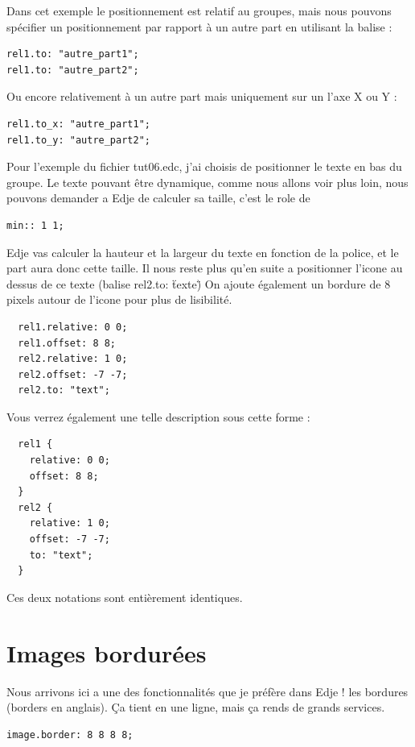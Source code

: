 \documentclass[a4paper]{efr}
\begin{document}
Dans cet exemple le positionnement est relatif au groupes, mais nous pouvons
spécifier un positionnement par rapport à un autre part en utilisant la balise :

\begin{lstlisting}
rel1.to: "autre_part1";
rel1.to: "autre_part2";
\end{lstlisting}

Ou encore relativement à un autre part mais uniquement sur un l'axe X ou Y :
\begin{lstlisting}
rel1.to_x: "autre_part1";
rel1.to_y: "autre_part2";
\end{lstlisting}


Pour l'exemple du fichier tut06.edc, j'ai choisis de positionner le texte en bas
du groupe. Le texte pouvant être dynamique, comme nous allons voir plus loin,
nous pouvons demander a Edje de calculer sa taille, c'est le role de
\begin{lstlisting}
min:: 1 1;
\end{lstlisting}

Edje vas calculer la  hauteur et la largeur du texte en fonction de la police,
et le part aura donc cette taille. Il nous reste plus qu'en suite a positionner
l'icone au dessus de ce texte (balise rel2.to: \"texte\")
On ajoute également un bordure de 8 pixels autour de l'icone pour plus de
lisibilité.
\begin{lstlisting}
  rel1.relative: 0 0;
  rel1.offset: 8 8;
  rel2.relative: 1 0;
  rel2.offset: -7 -7;
  rel2.to: "text";
\end{lstlisting}

Vous verrez également une telle description sous cette forme :
\begin{lstlisting}
  rel1 {
    relative: 0 0;
    offset: 8 8;
  }
  rel2 {
    relative: 1 0;
    offset: -7 -7;
    to: "text";
  }
\end{lstlisting}

Ces deux notations sont entièrement identiques.

\section{Images bordurées}

Nous arrivons ici a une des fonctionnalités que je préfère dans Edje ! les
bordures (borders en anglais). Ça tient en une ligne, mais ça rends de grands
services.

\begin{lstlisting}
image.border: 8 8 8 8;
\end{lstlisting}
\end{document}

